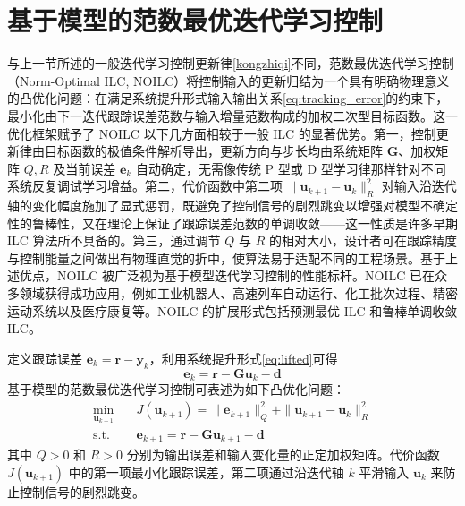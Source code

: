 \section{基于模型的范数最优迭代学习控制}

与上一节所述的一般迭代学习控制更新律\eqref{kongzhiqi}不同，范数最优迭代学习控制（Norm-Optimal ILC, NOILC）将控制输入的更新归结为一个具有明确物理意义的凸优化问题：在满足系统提升形式输入输出关系\eqref{eq:tracking_error}的约束下，最小化由下一迭代跟踪误差范数与输入增量范数构成的加权二次型目标函数。这一优化框架赋予了 NOILC 以下几方面相较于一般 ILC 的显著优势。第一，控制更新律由目标函数的极值条件解析导出，更新方向与步长均由系统矩阵 $\mathbf{G}$、加权矩阵 $Q,R$ 及当前误差 $\mathbf{e}_k$ 自动确定，无需像传统 P 型或 D 型学习律那样针对不同系统反复调试学习增益。第二，代价函数中第二项 $\|\mathbf{u}_{k+1}-\mathbf{u}_k\|_R^2$ 对输入沿迭代轴的变化幅度施加了显式惩罚，既避免了控制信号的剧烈跳变以增强对模型不确定性的鲁棒性，又在理论上保证了跟踪误差范数的单调收敛——这一性质是许多早期 ILC 算法所不具备的。第三，通过调节 $Q$ 与 $R$ 的相对大小，设计者可在跟踪精度与控制能量之间做出有物理直觉的折中，使算法易于适配不同的工程场景。基于上述优点，NOILC 被广泛视为基于模型迭代学习控制的性能标杆。NOILC 已在众多领域获得成功应用，例如工业机器人、高速列车自动运行、化工批次过程、精密运动系统以及医疗康复等。NOILC 的扩展形式包括预测最优 ILC 和鲁棒单调收敛 ILC。

定义跟踪误差 $\mathbf{e}_k = \mathbf{r} - \mathbf{y}_k$，利用系统提升形式\eqref{eq:lifted}可得
\begin{equation}
	\mathbf{e}_k = \mathbf{r} - \mathbf{G} \mathbf{u}_k - \mathbf{d}
	\label{eq:tracking_error}
\end{equation}
基于模型的范数最优迭代学习控制可表述为如下凸优化问题：
\begin{equation}
	\begin{aligned}
		\min_{\mathbf{u}_{k+1}} \quad & J(\mathbf{u}_{k+1}) = \|\mathbf{e}_{k+1}\|_Q^2 + \|\mathbf{u}_{k+1} - \mathbf{u}_k\|_R^2 \\
		\mathrm{s.t.} \quad & \mathbf{e}_{k+1} = \mathbf{r} - \mathbf{G} \mathbf{u}_{k+1} - \mathbf{d}
	\end{aligned}
	\label{eq:model_based_NOILC}
\end{equation}
其中 \(Q > 0\) 和 \(R > 0\) 分别为输出误差和输入变化量的正定加权矩阵。代价函数 $J(\mathbf{u}_{k+1})$ 中的第一项最小化跟踪误差，第二项通过沿迭代轴 \(k\) 平滑输入 \(\mathbf{u}_{k}\) 来防止控制信号的剧烈跳变。

